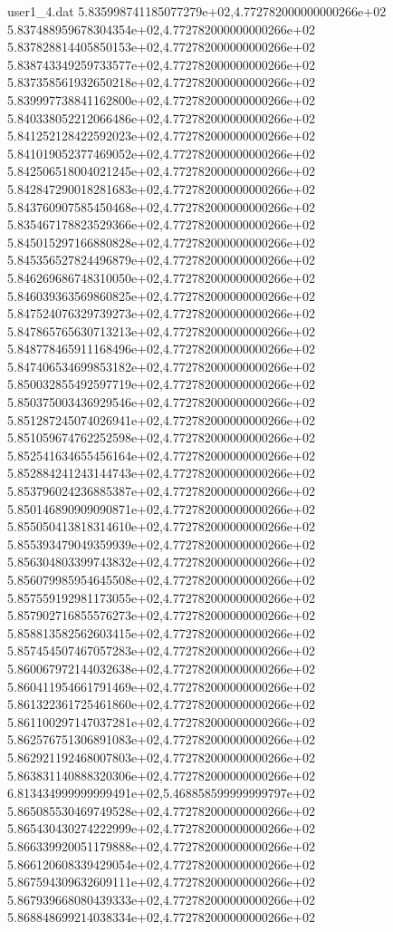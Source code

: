 \begin{filecontents}{user1_4.dat}
5.835998741185077279e+02,4.772782000000000266e+02
5.837488959678304354e+02,4.772782000000000266e+02
5.837828814405850153e+02,4.772782000000000266e+02
5.838743349259733577e+02,4.772782000000000266e+02
5.837358561932650218e+02,4.772782000000000266e+02
5.839997738841162800e+02,4.772782000000000266e+02
5.840338052212066486e+02,4.772782000000000266e+02
5.841252128422592023e+02,4.772782000000000266e+02
5.841019052377469052e+02,4.772782000000000266e+02
5.842506518004021245e+02,4.772782000000000266e+02
5.842847290018281683e+02,4.772782000000000266e+02
5.843760907585450468e+02,4.772782000000000266e+02
5.835467178823529366e+02,4.772782000000000266e+02
5.845015297166880828e+02,4.772782000000000266e+02
5.845356527824496879e+02,4.772782000000000266e+02
5.846269686748310050e+02,4.772782000000000266e+02
5.846039363569860825e+02,4.772782000000000266e+02
5.847524076329739273e+02,4.772782000000000266e+02
5.847865765630713213e+02,4.772782000000000266e+02
5.848778465911168496e+02,4.772782000000000266e+02
5.847406534699853182e+02,4.772782000000000266e+02
5.850032855492597719e+02,4.772782000000000266e+02
5.850375003436929546e+02,4.772782000000000266e+02
5.851287245074026941e+02,4.772782000000000266e+02
5.851059674762252598e+02,4.772782000000000266e+02
5.852541634655456164e+02,4.772782000000000266e+02
5.852884241243144743e+02,4.772782000000000266e+02
5.853796024236885387e+02,4.772782000000000266e+02
5.850146890909090871e+02,4.772782000000000266e+02
5.855050413818314610e+02,4.772782000000000266e+02
5.855393479049359939e+02,4.772782000000000266e+02
5.856304803399743832e+02,4.772782000000000266e+02
5.856079985954645508e+02,4.772782000000000266e+02
5.857559192981173055e+02,4.772782000000000266e+02
5.857902716855576273e+02,4.772782000000000266e+02
5.858813582562603415e+02,4.772782000000000266e+02
5.857454507467057283e+02,4.772782000000000266e+02
5.860067972144032638e+02,4.772782000000000266e+02
5.860411954661791469e+02,4.772782000000000266e+02
5.861322361725461860e+02,4.772782000000000266e+02
5.861100297147037281e+02,4.772782000000000266e+02
5.862576751306891083e+02,4.772782000000000266e+02
5.862921192468007803e+02,4.772782000000000266e+02
5.863831140888320306e+02,4.772782000000000266e+02
6.813434999999999491e+02,5.468858599999999797e+02
5.865085530469749528e+02,4.772782000000000266e+02
5.865430430274222999e+02,4.772782000000000266e+02
5.866339920051179888e+02,4.772782000000000266e+02
5.866120608339429054e+02,4.772782000000000266e+02
5.867594309632609111e+02,4.772782000000000266e+02
5.867939668080439333e+02,4.772782000000000266e+02
5.868848699214038334e+02,4.772782000000000266e+02

\end{filecontents}
